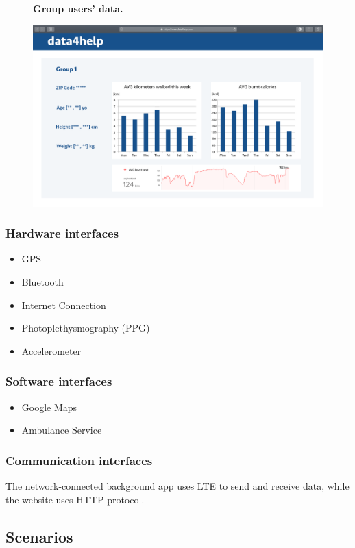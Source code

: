 \documentclass{article}
\begin{document}
\begin{figure}[h!]
\centering
    \textbf{Group users' data.}\par\medskip
	\includegraphics[width= \linewidth]{7groupprofile.png}
\end{figure}\newpage
\subsubsection{Hardware interfaces}
\begin{itemize}
	\item GPS
	\item Bluetooth
	\item Internet Connection
	\item Photoplethysmography (PPG)
	\item Accelerometer
\end{itemize}
\subsubsection{Software interfaces}
\begin{itemize}
	\item Google Maps
	\item Ambulance Service
\end{itemize}
\subsubsection{Communication interfaces}
The network-connected background app uses LTE to send and receive data, while the website uses HTTP protocol.
\subsection{Scenarios}
\end{document}
